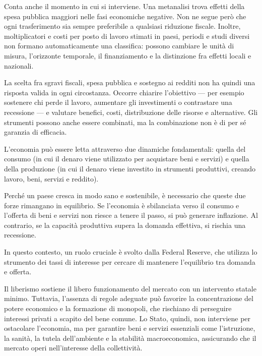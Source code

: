 \documentclass[12pt]{book} %
\begin{document}
Conta anche il momento in cui si interviene. Una metanalisi trova effetti della spesa pubblica maggiori nelle fasi economiche negative. Non ne segue però che ogni trasferimento sia sempre preferibile a qualsiasi riduzione fiscale. Inoltre, moltiplicatori e costi per posto di lavoro stimati in paesi, periodi e studi diversi non formano automaticamente una classifica: possono cambiare le unità di misura, l'orizzonte temporale, il finanziamento e la distinzione fra effetti locali e nazionali.

La scelta fra sgravi fiscali, spesa pubblica e sostegno ai redditi non ha quindi una risposta valida in ogni circostanza. Occorre chiarire l'obiettivo --- per esempio sostenere chi perde il lavoro, aumentare gli investimenti o contrastare una recessione --- e valutare benefici, costi, distribuzione delle risorse e alternative. Gli strumenti possono anche essere combinati, ma la combinazione non è di per sé garanzia di efficacia.

L'economia può essere letta attraverso due dinamiche fondamentali: quella del consumo (in cui il denaro viene utilizzato per acquistare beni e servizi) e quella della produzione (in cui il denaro viene investito in strumenti produttivi, creando lavoro, beni, servizi e reddito).

Perché un paese cresca in modo sano e sostenibile, è necessario che queste due forze rimangano in equilibrio.
Se l’economia è sbilanciata verso il consumo e l’offerta di beni e servizi non riesce a tenere il passo, si può generare inflazione.
Al contrario, se la capacità produttiva supera la domanda effettiva, si rischia una recessione.

In questo contesto, un ruolo cruciale è svolto dalla Federal Reserve, che utilizza lo strumento dei tassi di interesse per cercare di mantenere l’equilibrio tra domanda e offerta.

Il liberismo sostiene il libero funzionamento del mercato con un intervento statale minimo. Tuttavia, l’assenza di regole adeguate può favorire la concentrazione del potere economico e la formazione di monopoli, che rischiano di perseguire interessi privati a scapito del bene comune.
Lo Stato, quindi, non interviene per ostacolare l’economia, ma per garantire beni e servizi essenziali come l’istruzione, la sanità, la tutela dell’ambiente e la stabilità macroeconomica, assicurando che il mercato operi nell’interesse della collettività.
\end{document}
